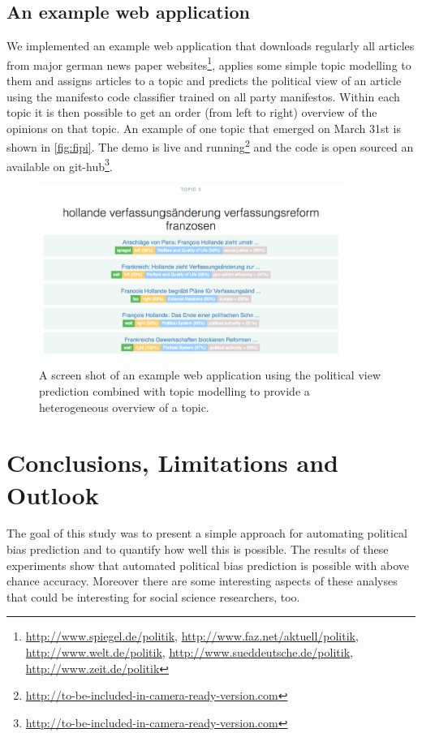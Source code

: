 \documentclass[runningheads,a4paper]{llncs}
\begin{document}
\subsection{An example web application}
We implemented an example web application that downloads regularly all articles from major german news paper websites\footnote{\url{http://www.spiegel.de/politik}, \url{http://www.faz.net/aktuell/politik}, \url{http://www.welt.de/politik}, \url{http://www.sueddeutsche.de/politik}, \url{http://www.zeit.de/politik}}, applies some simple topic modelling to them and assigns articles to a topic and predicts the political view of an article using the manifesto code classifier trained on all party manifestos. Within each topic it is then possible to get an order (from left to right) overview of the opinions on that topic. An example of one topic that emerged on March 31st is shown in \autoref{fig:fipi}. The demo is live and running\footnote{\url{http://to-be-included-in-camera-ready-version.com}} and the code is open sourced an available on git-hub\footnote{\url{http://to-be-included-in-camera-ready-version.com}}.
\begin{figure}
\begin{center}
\includegraphics[width=10cm]{images/fipi-screenshot}
%
\end{center}
\caption{
\label{fig:fipi}
A screen shot of an example web application using the political view prediction combined with topic modelling to provide a heterogeneous overview of a topic. }
\end{figure}


\section{Conclusions, Limitations and Outlook}\label{sec:conclusion}
The goal of this study was to present a simple approach for automating political bias prediction and to quantify how well this is possible. The results of these experiments show that automated political bias prediction is possible with above chance accuracy. Moreover there are some interesting aspects of these analyses that could be interesting for social science researchers, too.
\end{document}
